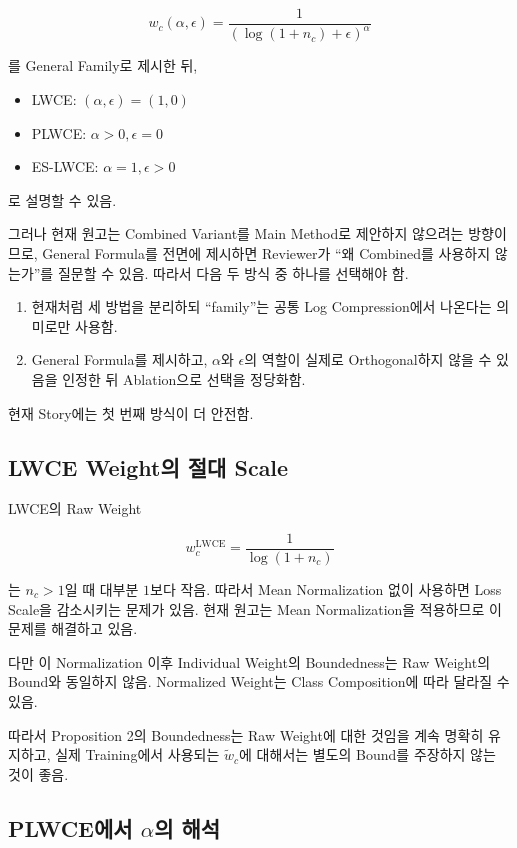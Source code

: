 \documentclass[11pt,a4paper]{article}
\begin{document}
\[
w_c(\alpha,\epsilon)
=
\frac{1}{\left(\log(1+n_c)+\epsilon\right)^\alpha}
\]

를 General Family로 제시한 뒤,

\begin{itemize}
\item LWCE: \((\alpha,\epsilon)=(1,0)\)
\item PLWCE: \(\alpha>0,\epsilon=0\)
\item ES-LWCE: \(\alpha=1,\epsilon>0\)
\end{itemize}

로 설명할 수 있음.

그러나 현재 원고는 Combined Variant를 Main Method로 제안하지 않으려는 방향이므로, General Formula를 전면에 제시하면 Reviewer가 ``왜 Combined를 사용하지 않는가''를 질문할 수 있음. 따라서 다음 두 방식 중 하나를 선택해야 함.

\begin{enumerate}
\item 현재처럼 세 방법을 분리하되 ``family''는 공통 Log Compression에서 나온다는 의미로만 사용함.
\item General Formula를 제시하고, \(\alpha\)와 \(\epsilon\)의 역할이 실제로 Orthogonal하지 않을 수 있음을 인정한 뒤 Ablation으로 선택을 정당화함.
\end{enumerate}

현재 Story에는 첫 번째 방식이 더 안전함.

\subsection{LWCE Weight의 절대 Scale}

LWCE의 Raw Weight

\[
w_c^{\mathrm{LWCE}}
=
\frac{1}{\log(1+n_c)}
\]

는 \(n_c>1\)일 때 대부분 \(1\)보다 작음. 따라서 Mean Normalization 없이 사용하면 Loss Scale을 감소시키는 문제가 있음. 현재 원고는 Mean Normalization을 적용하므로 이 문제를 해결하고 있음.

다만 이 Normalization 이후 Individual Weight의 Boundedness는 Raw Weight의 Bound와 동일하지 않음. Normalized Weight는 Class Composition에 따라 달라질 수 있음.

따라서 Proposition 2의 Boundedness는 Raw Weight에 대한 것임을 계속 명확히 유지하고, 실제 Training에서 사용되는 \(\widetilde{w}_c\)에 대해서는 별도의 Bound를 주장하지 않는 것이 좋음.

\subsection{PLWCE에서 \(\alpha\)의 해석}
\end{document}
